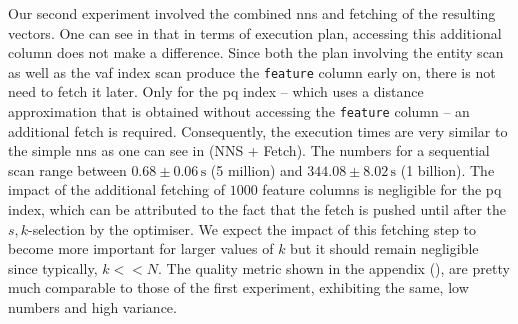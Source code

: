 Our second experiment involved the combined \acrshort{nns} and fetching of the resulting vectors. One can see in  that in terms of execution plan, accessing this additional column does not make a difference. Since both the plan involving the entity scan as well as the \acrshort{vaf} index scan produce the \texttt{feature} column early on, there is not need to fetch it later. Only for the \acrshort{pq} index -- which uses a distance approximation that is obtained without accessing the \texttt{feature} column -- an additional fetch is required. Consequently, the execution times are very similar to the simple \acrshort{nns} as one can see in  (NNS + Fetch). The numbers for a sequential scan range between $0.68 \pm 0.06 \, \si{\second}$ (5 million) and $344.08 \pm 8.02 \, \si{\second}$ (1 billion). The impact of the additional fetching of $1000$ feature columns is negligible for the \acrshort{pq} index, which can be attributed to the fact that the fetch is pushed until after the $s,k$-selection by the optimiser. We expect the impact of this fetching step to become more important for larger values of $k$ but it should remain negligible since typically, $k << N$. The quality metric shown in the appendix (), are pretty much comparable to those of the first experiment, exhibiting the same, low numbers and high variance.

